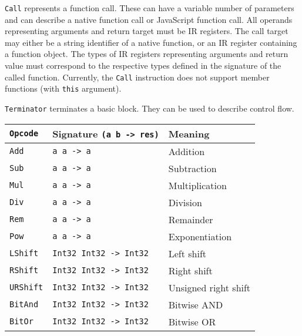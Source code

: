 \texttt{Call} represents a function call. These can have a variable number of parameters and can describe a native function call or JavaScript function call. All operands representing arguments and return target must be IR registers. The call target may either be a string identifier of a native function, or an IR register containing a function object. The types of IR registers representing arguments and return value must correspond to the respective types defined in the signature of the called function. Currently, the \texttt{Call} instruction does not support member functions (with \texttt{this} argument).

\texttt{Terminator} terminates a basic block. They can be used to describe control flow.


\begin{table}
    \centering
    \begin{tabular}{l | l | l}
        \texttt{Opcode}      & Signature \texttt{(a b -> res)}    &  Meaning                    \\\hline
        \texttt{Add}         & \texttt{a      a     -> a        } &  Addition                   \\
        \texttt{Sub}         & \texttt{a      a     -> a        } &  Subtraction                \\
        \texttt{Mul}         & \texttt{a      a     -> a        } &  Multiplication             \\
        \texttt{Div}         & \texttt{a      a     -> a        } &  Division                   \\
        \texttt{Rem}         & \texttt{a      a     -> a        } &  Remainder                  \\
        \texttt{Pow}         & \texttt{a      a     -> a        } &  Exponentiation             \\
        \texttt{LShift}      & \texttt{Int32  Int32 -> Int32    } &  Left shift                 \\
        \texttt{RShift}      & \texttt{Int32  Int32 -> Int32    } &  Right shift                \\
        \texttt{URShift}     & \texttt{Int32  Int32 -> Int32    } &  Unsigned right shift       \\
        \texttt{BitAnd}      & \texttt{Int32  Int32 -> Int32    } &  Bitwise AND                \\
        \texttt{BitOr}       & \texttt{Int32  Int32 -> Int32    } &  Bitwise OR                 \\

\end{tabular}
\end{table}
